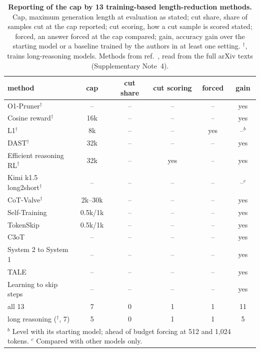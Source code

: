 \documentclass[10pt]{article}
\begin{document}
\begin{table}[h]
\centering\small
\caption{\textbf{Reporting of the cap by 13 training-based length-reduction methods.} Cap, maximum generation length at evaluation as stated; cut share, share of samples cut at the cap reported; cut scoring, how a cut sample is scored stated; forced, an answer forced at the cap compared; gain, accuracy gain over the starting model or a baseline trained by the authors in at least one setting. $^{\dagger}$, trains long-reasoning models. Methods from ref.~\cite{sui2025stopoverthinking}, read from the full arXiv texts (Supplementary Note~4).}
\label{tab:audit}
\setlength{\tabcolsep}{5pt}
\begin{tabular}{lccccc}
\toprule
method & cap & cut share & cut scoring & forced & gain \\
\midrule
O1-Pruner$^{\dagger}$\cite{luo2026o1pruner} & -- & -- & -- & -- & yes \\
Cosine reward$^{\dagger}$\cite{yeo2025demystifying} & 16k & -- & -- & -- & yes \\
L1$^{\dagger}$\cite{aggarwal2025l1} & 8k & -- & -- & yes & --$^{b}$ \\
DAST$^{\dagger}$\cite{shen2025dast} & 32k & -- & -- & -- & yes \\
Efficient reasoning RL$^{\dagger}$\cite{arora2025training} & 32k & -- & yes & -- & yes \\
Kimi k1.5 long2short$^{\dagger}$\cite{kimi2025k15} & -- & -- & -- & -- & --$^{c}$ \\
CoT-Valve$^{\dagger}$\cite{ma2025cotvalve} & 2k--30k & -- & -- & -- & yes \\
Self-Training\cite{munkhbat2025concise} & 0.5k/1k & -- & -- & -- & yes \\
TokenSkip\cite{xia2025tokenskip} & 0.5k/1k & -- & -- & -- & yes \\
C3oT\cite{kang2025c3ot} & -- & -- & -- & -- & yes \\
System 2 to System 1\cite{yu2024distilling} & -- & -- & -- & -- & yes \\
TALE\cite{han2025tale} & -- & -- & -- & -- & yes \\
Learning to skip steps\cite{liu2024skipsteps} & -- & -- & -- & -- & yes \\
\midrule
all 13 & 7 & 0 & 1 & 1 & 11 \\
long reasoning ($^{\dagger}$, 7) & 5 & 0 & 1 & 1 & 5 \\
\bottomrule
\multicolumn{6}{l}{\footnotesize $^{b}$ Level with its starting model; ahead of budget forcing at 512 and 1{,}024 tokens. $^{c}$ Compared with other models only.}
\end{tabular}
\end{table}
\end{document}
